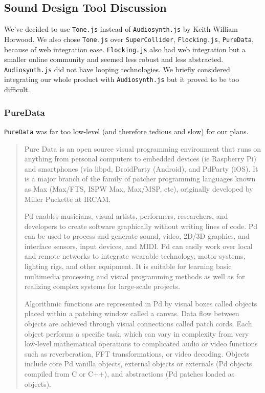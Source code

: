 \documentclass[12pt,a4paper]{article}
\newcommand{\lightcode}[1]{\colorbox{light-gray}{\texttt{#1}}}
\begin{document}
\subsection{Sound Design Tool Discussion}
We've decided to use \lightcode{Tone.js} instead of \lightcode{Audiosynth.js} by Keith William Horwood. We also chose \lightcode{Tone.js} over \lightcode{SuperCollider}, \lightcode{Flocking.js}, \lightcode{PureData}, because of web integration ease. \lightcode{Flocking.js} also had web integration but a smaller online community and seemed less robust and less abstracted. \lightcode{Audiosynth.js} did not have looping technologies. We briefly considered integrating our whole product with \lightcode{Audiosynth.js} but it proved to be too difficult.

\subsubsection{PureData}
\lightcode{PureData} was far too low-level (and therefore tedious and slow) for our plans.

\begin{quote}
Pure Data is an open source visual programming environment that runs on anything from personal computers to embedded devices (ie Raspberry Pi) and smartphones (via libpd, DroidParty (Android), and PdParty (iOS). It is a major branch of the family of patcher programming languages known as Max (Max/FTS, ISPW Max, Max/MSP, etc), originally developed by Miller Puckette at IRCAM.

Pd enables musicians, visual artists, performers, researchers, and developers to create software graphically without writing lines of code. Pd can be used to process and generate sound, video, 2D/3D graphics, and interface sensors, input devices, and MIDI. Pd can easily work over local and remote networks to integrate wearable technology, motor systems, lighting rigs, and other equipment. It is suitable for learning basic multimedia processing and visual programming methods as well as for realizing complex systems for large-scale projects.

Algorithmic functions are represented in Pd by visual boxes called objects placed within a patching window called a canvas. Data flow between objects are achieved through visual connections called patch cords. Each object performs a specific task, which can vary in complexity from very low-level mathematical operations to complicated audio or video functions such as reverberation, FFT transformations, or video decoding. Objects include core Pd vanilla objects, external objects or externals (Pd objects compiled from C or C++), and abstractions (Pd patches loaded as objects). \cite{puredata}
\end{quote}
\end{document}
